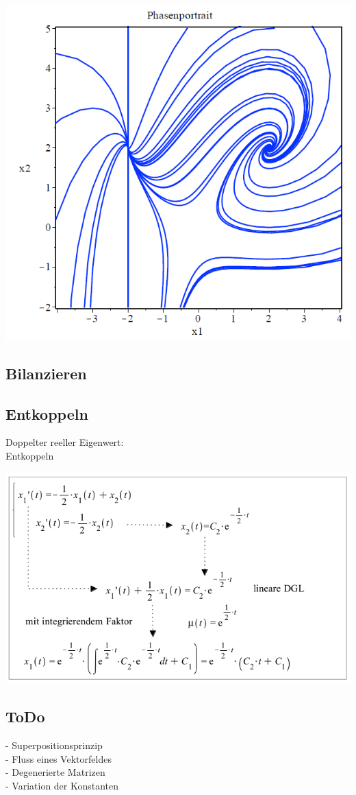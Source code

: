 \begin{minipage}[h]{0.35\textwidth}
	\includegraphics[width=1.0\textwidth]{images/Phasenportrait.png}
\end{minipage}


\subsection{Bilanzieren}


\subsection{Entkoppeln}
\begin{minipage}[h]{0.35\textwidth}
Doppelter reeller Eigenwert:\\ Entkoppeln
\end{minipage}
\begin{minipage}[h]{0.5\textwidth}
	\includegraphics[width=1.0\textwidth]{images/Entkoppeln.png}
\end{minipage}

\subsection{ToDo}
- Superpositionsprinzip\\
- Fluss eines Vektorfeldes\\
- Degenerierte Matrizen\\
- Variation der Konstanten\\
